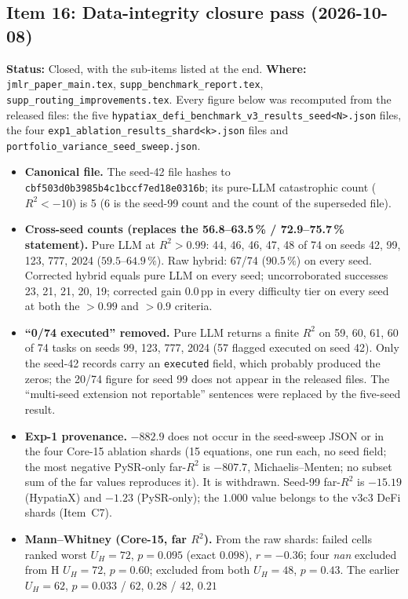 \documentclass[11pt]{article}
\newcommand{\Rsq}{R^{2}}
\begin{document}
\subsection*{Item 16: Data-integrity closure pass (2026-10-08)}
\textbf{Status:} Closed, with the sub-items listed at the end. \textbf{Where:} \texttt{jmlr\_paper\_main.tex},
\texttt{supp\_benchmark\_report.tex}, \texttt{supp\_routing\_improvements.tex}. Every figure below was recomputed from the
released files: the five \texttt{hypatiax\_defi\_benchmark\_v3\_results\_seed<N>.json} files, the four
\texttt{exp1\_ablation\_results\_shard<k>.json} files and \texttt{portfolio\_variance\_seed\_sweep.json}.
\begin{itemize}\small
\item \textbf{Canonical file.} The seed-42 file hashes to \texttt{cbf503d0b3985b4c1bccf7ed18e0316b}; its pure-LLM catastrophic count
($\Rsq<-10$) is 5 (6 is the seed-99 count and the count of the superseded file).
\item \textbf{Cross-seed counts (replaces the 56.8--63.5\,\% / 72.9--75.7\,\% statement).} Pure LLM at $\Rsq>0.99$: 44, 46, 46, 47, 48 of 74
on seeds 42, 99, 123, 777, 2024 ($59.5$--$64.9\,\%$). Raw hybrid: 67/74 ($90.5\,\%$) on every seed. Corrected hybrid equals pure LLM on every
seed; uncorroborated successes 23, 21, 21, 20, 19; corrected gain $0.0$\,pp in every difficulty tier on every seed at both the $>0.99$ and $>0.9$ criteria.
\item \textbf{``0/74 executed'' removed.} Pure LLM returns a finite $\Rsq$ on 59, 60, 61, 60 of 74 tasks on seeds 99, 123, 777, 2024
(57 flagged executed on seed 42). Only the seed-42 records carry an \texttt{executed} field, which probably produced the zeros;
the 20/74 figure for seed 99 does not appear in the released files. The ``multi-seed extension not reportable'' sentences were replaced by the five-seed result.
\item \textbf{Exp-1 provenance.} $-882.9$ does not occur in the seed-sweep JSON or in the four Core-15 ablation shards (15 equations, one run each, no seed
field; the most negative PySR-only far-$\Rsq$ is $-807.7$, Michaelis--Menten; no subset sum of the far values reproduces it). It is withdrawn.
Seed-99 far-$\Rsq$ is $-15.19$ (HypatiaX) and $-1.23$ (PySR-only); the $1.000$ value belongs to the v3c3 DeFi shards (Item~C7).
\item \textbf{Mann--Whitney (Core-15, far $\Rsq$).} From the raw shards: failed cells ranked worst $U_H=72$, $p=0.095$ (exact $0.098$), $r=-0.36$;
four \textit{nan} excluded from H $U_H=72$, $p=0.60$; excluded from both $U_H=48$, $p=0.43$. The earlier $U_H=62$, $p=0.033$ / $62$, $0.28$ / $42$, $0.21$

\end{itemize}
\end{document}
